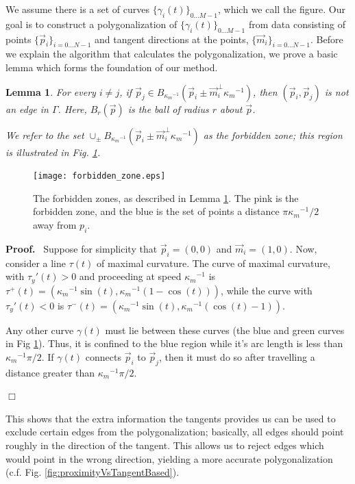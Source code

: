 \documentclass{article}
\newenvironment{proof}{
  \noindent\textbf{Proof.}\ }{\hspace*{\fill}
  \begin{math}\Box\end{math}\medskip}
\newtheorem{lemma}[cntr]{Lemma}
\numberwithin{cntr}{section}
\numberwithin{equation}{section}
\newcommand{\vp}[0]{{\vec{p}}}
\newcommand{\vm}[0]{{\vec{m}}}
\newcommand{\Oto}[1]{{0 \ldots #1-1}}
\newcommand{\OtoN}{{0 \ldots N-1}}
\newcommand{\pointData}{{ \{ \vp_{i} \}_{i=\OtoN} }}
\newcommand{\tanData}{{ \{ \vm_{i} \}_{i=\OtoN} }}
\newcommand{\curveSet}{{ \{ \gamma_i(t) \}_{\Oto{M}}}}
\newcommand{\poly}{{\Gamma}}
\newcommand{\ball}[2]{ { B_{#1}(#2) } }
\newcommand{\curvemax}{{\kappa_{m}}}
\newcommand{\curvemaxi}{{\curvemax^{-1}}}
\begin{document}
We assume there is a set of curves $\curveSet$, which we call the figure. Our goal is to construct a polygonalization of $\curveSet$ from data consisting of points $\pointData$ and tangent directions at the points, $\tanData$. Before we explain the algorithm that calculates the polygonalization, we prove a basic lemma which forms the foundation of our method.
\begin{lemma}
  \label{lem:forbiddenZone}
  For every $i \neq j$, if $\vp_{j} \in \ball{\curvemaxi}{\vp_{i} \pm \vm_{i}^{\perp} \curvemaxi}$, then $(\vp_{i},\vp_{j})$ is not an edge in $\poly$. Here, $\ball{r}{\vp}$ is the ball of radius $r$ about $\vp$.

  We refer to the set $\cup_{\pm} \ball{\curvemaxi}{\vp_{i} \pm \vm_{i}^{\perp} \curvemaxi}$ as the \emph{forbidden zone}; this region is illustrated in Fig. \ref{fig:forbiddenZone}.
\end{lemma}
\begin{figure}
\setlength{\unitlength}{0.240900pt}
\ifx\plotpoint\undefined\newsavebox{\plotpoint}\fi
\sbox{\plotpoint}{\rule[-0.200pt]{0.400pt}{0.400pt}}%
\texttt{[image: forbidden\_zone.eps]}

\caption{The forbidden zones, as described in Lemma \ref{lem:forbiddenZone}. The pink is the forbidden zone, and the blue is the set of points a distance $\pi \curvemaxi/2$ away from $p_{i}$.}
\label{fig:forbiddenZone}
\end{figure}
\begin{proof}
  Suppose for simplicity that $\vp_{i}=(0,0)$ and $\vm_{i}=(1,0)$. Now, consider a line $\tau(t)$ of maximal curvature. The curve of maximal curvature, with $\tau_{y}'(t) > 0$ and proceeding at speed $\curvemaxi$ is $\tau^{+}(t)=(\curvemaxi \sin(t), \curvemaxi (1-\cos(t)))$, while the curve with $\tau_{y}'(t) < 0$ is $\tau^{-}(t)=(\curvemaxi \sin(t), \curvemaxi (\cos(t)-1))$.

Any other curve $\gamma(t)$ must lie between these curves (the blue and green curves in Fig \ref{lem:forbiddenZone}). Thus, it is confined to the blue region while it's arc length is less than $\curvemaxi \pi/2$. If $\gamma(t)$ connects $\vp_{i}$ to $\vp_{j}$, then it must do so after travelling a distance greater than $\curvemaxi \pi/2$.

\end{proof}

This shows that the extra information the tangents provides us can be used to exclude certain edges from the polygonalization; basically, all edges should point roughly in the direction of the tangent. This allows us to reject edges which would point in the wrong direction, yielding a more accurate polygonalization (c.f. Fig. \ref{fig:proximityVsTangentBased}).
\end{document}
